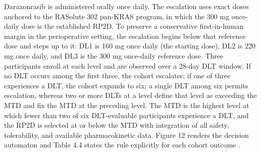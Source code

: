 Daraxonrasib is administered orally once daily. The escalation uses exact doses
anchored to the RASolute 302 pan-KRAS program, in which the 300 mg once-daily dose
is the established RP2D. To preserve a conservative first-in-human margin in the
perioperative setting, the escalation begins below that reference dose and steps up
to it: DL1 is 160 mg once daily (the starting dose), DL2 is 220 mg once daily, and
DL3 is the 300 mg once-daily reference dose. Three participants enroll at each level
and are observed over a 28-day DLT window. If no DLT occurs among the first three,
the cohort escalates; if one of three experiences a DLT, the cohort expands to six;
a single DLT among six permits escalation, whereas two or more DLTs at a level
define that level as exceeding the MTD and fix the MTD at the preceding level. The
MTD is the highest level at which fewer than two of six DLT-evaluable participants
experience a DLT, and the RP2D is selected at or below the MTD with integration of
all safety, tolerability, and available pharmacokinetic data. Figure 12 renders the
decision automaton and Table 4.4 states the rule explicitly for each cohort outcome
\cite{daraxwhipple,phase1guidance}.

